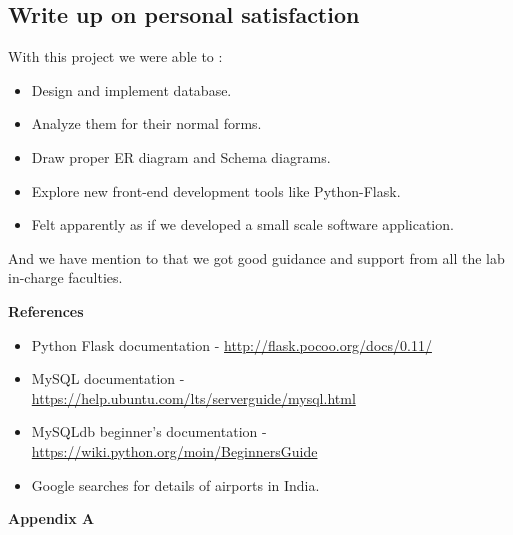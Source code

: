 \documentclass[hidelinks=true]{article}
\begin{document}
\subsection{Write up on personal satisfaction}
With this project we were able to :
\begin{itemize}
\item Design and implement database.
\item Analyze them for their normal forms.
\item Draw proper ER diagram and Schema diagrams.
\item Explore new front-end development tools like Python-Flask.
\item Felt apparently as if we developed a small scale software application.
\end{itemize}
And we have mention to that we got good guidance and support from all the lab in-charge faculties.

\pagebreak
\LARGE{\textbf{References}}
\begin{itemize}
\Large
\item Python Flask documentation - 
\url{http://flask.pocoo.org/docs/0.11/}
\item MySQL documentation - \url{https://help.ubuntu.com/lts/serverguide/mysql.html}
\item MySQLdb beginner's documentation -\url{https://wiki.python.org/moin/BeginnersGuide}
\item Google searches for details of airports in India.
\end{itemize}

\vspace{80pt}
\LARGE{\textbf{Appendix A}}


\normalsize
\listoffigures
\end{document}
